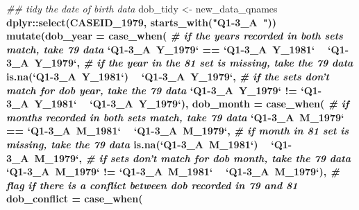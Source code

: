 \documentclass{article}
\newenvironment{Shaded}{\begin{snugshade}}{\end{snugshade}}
\newcommand{\CommentTok}[1]{\textcolor[rgb]{0.56,0.35,0.01}{\textit{#1}}}
\newcommand{\DataTypeTok}[1]{\textcolor[rgb]{0.13,0.29,0.53}{#1}}
\newcommand{\DecValTok}[1]{\textcolor[rgb]{0.00,0.00,0.81}{#1}}
\newcommand{\KeywordTok}[1]{\textcolor[rgb]{0.13,0.29,0.53}{\textbf{#1}}}
\newcommand{\NormalTok}[1]{#1}
\newcommand{\OperatorTok}[1]{\textcolor[rgb]{0.81,0.36,0.00}{\textbf{#1}}}
\newcommand{\StringTok}[1]{\textcolor[rgb]{0.31,0.60,0.02}{#1}}
\begin{document}
\begin{Shaded}
\begin{Highlighting}[]
\CommentTok{## tidy the date of birth data}
\NormalTok{dob_tidy <-}\StringTok{ }\NormalTok{new_data_qnames }\OperatorTok{%
\StringTok{  }\NormalTok{dplyr}\OperatorTok{::}\KeywordTok{select}\NormalTok{(CASEID_}\DecValTok{1979}\NormalTok{,}
         \KeywordTok{starts_with}\NormalTok{(}\StringTok{"Q1-3_A~"}\NormalTok{)) }\OperatorTok{%
\StringTok{  }\KeywordTok{mutate}\NormalTok{(}\DataTypeTok{dob_year =} \KeywordTok{case_when}\NormalTok{(}
                    \CommentTok{# if the years recorded in both sets match, take 79 data}
                    \StringTok{`}\DataTypeTok{Q1-3_A~Y_1979}\StringTok{`} \OperatorTok{==}\StringTok{ `}\DataTypeTok{Q1-3_A~Y_1981}\StringTok{`} \OperatorTok{~}\StringTok{ `}\DataTypeTok{Q1-3_A~Y_1979}\StringTok{`}\NormalTok{,}
                    \CommentTok{# if the year in the 81 set is missing, take the 79 data}
                    \KeywordTok{is.na}\NormalTok{(}\StringTok{`}\DataTypeTok{Q1-3_A~Y_1981}\StringTok{`}\NormalTok{) }\OperatorTok{~}\StringTok{ `}\DataTypeTok{Q1-3_A~Y_1979}\StringTok{`}\NormalTok{,}
                    \CommentTok{# if the sets don't match for dob year, take the 79 data}
                    \StringTok{`}\DataTypeTok{Q1-3_A~Y_1979}\StringTok{`} \OperatorTok{!=}\StringTok{ `}\DataTypeTok{Q1-3_A~Y_1981}\StringTok{`} \OperatorTok{~}\StringTok{ `}\DataTypeTok{Q1-3_A~Y_1979}\StringTok{`}\NormalTok{),}
        \DataTypeTok{dob_month =} \KeywordTok{case_when}\NormalTok{(}
                    \CommentTok{# if months recorded in both sets match, take 79 data}
                    \StringTok{`}\DataTypeTok{Q1-3_A~M_1979}\StringTok{`} \OperatorTok{==}\StringTok{ `}\DataTypeTok{Q1-3_A~M_1981}\StringTok{`} \OperatorTok{~}\StringTok{ `}\DataTypeTok{Q1-3_A~M_1979}\StringTok{`}\NormalTok{,}
                    \CommentTok{# if month in 81 set is missing, take the 79 data}
                    \KeywordTok{is.na}\NormalTok{(}\StringTok{`}\DataTypeTok{Q1-3_A~M_1981}\StringTok{`}\NormalTok{) }\OperatorTok{~}\StringTok{ `}\DataTypeTok{Q1-3_A~M_1979}\StringTok{`}\NormalTok{,}
                    \CommentTok{# if sets don't match for dob month, take the 79 data}
                    \StringTok{`}\DataTypeTok{Q1-3_A~M_1979}\StringTok{`} \OperatorTok{!=}\StringTok{ `}\DataTypeTok{Q1-3_A~M_1981}\StringTok{`} \OperatorTok{~}\StringTok{ `}\DataTypeTok{Q1-3_A~M_1979}\StringTok{`}\NormalTok{),}
        \CommentTok{# flag if there is a conflict between dob recorded in 79 and 81}
        \DataTypeTok{dob_conflict =} \KeywordTok{case_when}\NormalTok{(     }
}}
\end{Highlighting}
\end{Shaded}
\end{document}
